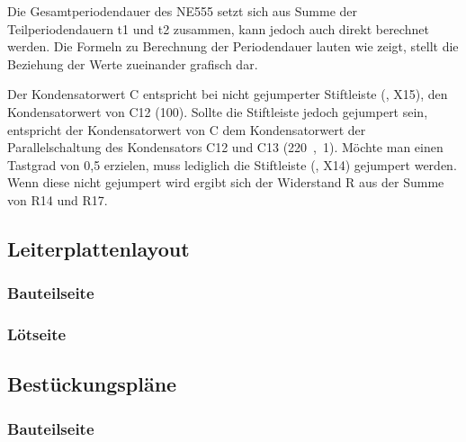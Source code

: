 
Die Gesamtperiodendauer des NE555 setzt sich aus Summe der Teilperiodendauern t1 und t2 zusammen, kann jedoch auch direkt berechnet werden. Die Formeln zu Berechnung der Periodendauer lauten wie  zeigt,  stellt die Beziehung der Werte zueinander grafisch dar.



Der Kondensatorwert C entspricht bei nicht gejumperter Stiftleiste (, X15), den Kondensatorwert von C12 (\unit{100}{\nano\farad}). Sollte die Stiftleiste jedoch gejumpert sein, entspricht der Kondensatorwert von C dem Kondensatorwert der Parallelschaltung des Kondensators C12 und C13 (\unit{220,1}{\micro\farad}). Möchte man einen Tastgrad von 0,5 erzielen, muss lediglich die Stiftleiste (, X14) gejumpert werden. Wenn diese nicht gejumpert wird ergibt sich der Widerstand R aus der Summe von R14 und R17.

\subsection{Leiterplattenlayout}
\label{sec:basisplatine-leiterplattenlayout}
\subsubsection{Bauteilseite}

\subsubsection{Lötseite}

\subsection{Bestückungspläne}
\label{sec:basisplatine-bestückungspläne}
\subsubsection{Bauteilseite}
